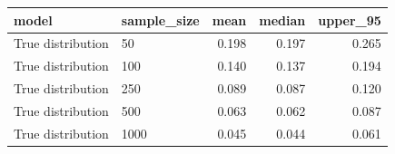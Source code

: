 
\begin{tabular}{llrrr}
\toprule
model & sample\_size & mean & median & upper\_95\\
\midrule
True distribution & 50 & 0.198 & 0.197 & 0.265\\
True distribution & 100 & 0.140 & 0.137 & 0.194\\
True distribution & 250 & 0.089 & 0.087 & 0.120\\
True distribution & 500 & 0.063 & 0.062 & 0.087\\
True distribution & 1000 & 0.045 & 0.044 & 0.061\\
\bottomrule
\end{tabular}
